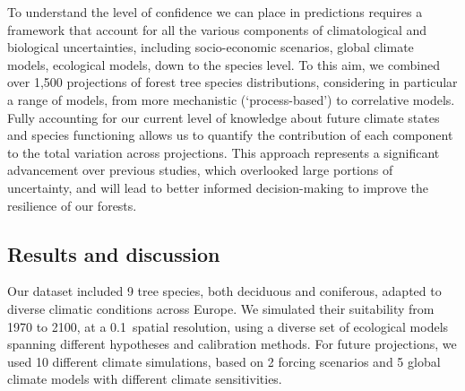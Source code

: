 \documentclass[11pt,letter]{article}
\begin{document}
To understand the level of confidence we can place in predictions requires a framework that account for all the various components of climatological and biological uncertainties, including socio-economic scenarios, global climate models, ecological models, down to the species level. To this aim, we combined over 1,500 projections of forest tree species distributions, considering in particular a range of models, from more mechanistic (‘process-based’) to correlative models. Fully accounting for our current level of knowledge about future climate states and species functioning allows us to quantify the contribution of each component to the total variation across projections. This approach represents a significant advancement over previous studies, which overlooked large portions of uncertainty, and will lead to better informed decision-making to improve the resilience of our forests.


\subsection*{Results and discussion}

Our dataset included 9 tree species, both deciduous and coniferous, adapted to diverse climatic conditions across Europe. We simulated their suitability from 1970 to 2100, at a 0.1\degree~spatial resolution, using a diverse set of ecological models spanning different hypotheses and calibration methods. For future projections, we used 10 different climate simulations, based on 2 forcing scenarios and 5 global climate models with different climate sensitivities.
\end{document}
